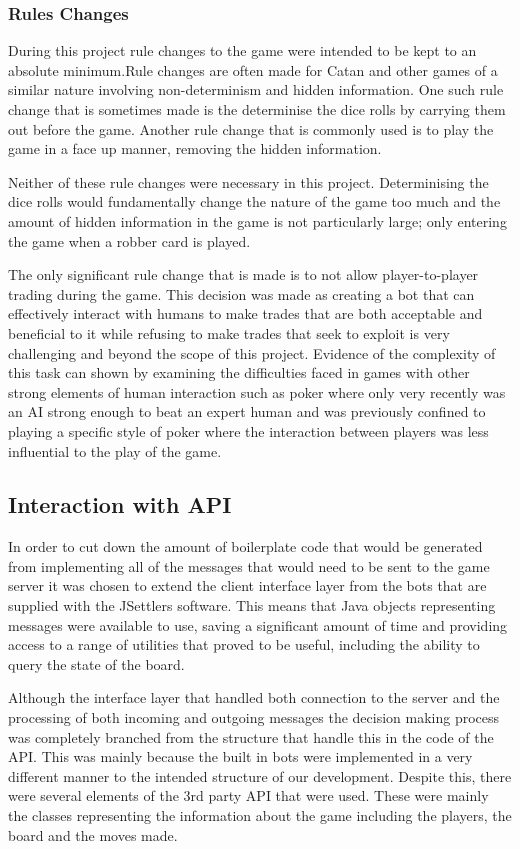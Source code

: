 \documentclass[]{article}
\begin{document}
\subsubsection{Rules Changes}
During this project rule changes to the game were intended to be kept to an absolute minimum.Rule changes are often made for Catan and other games of a similar nature involving non-determinism and hidden information. One such rule change that is sometimes made is the determinise the dice rolls by carrying them out before the game. Another rule change that is commonly used is to play the game in a face up manner, removing the hidden information.

Neither of these rule changes were necessary in this project. Determinising the dice rolls would fundamentally change the nature of the game too much and the amount of hidden information in the game is not particularly large; only entering the game when a robber card is played.

The only significant rule change that is made is to not allow player-to-player trading during the game. This decision was made as creating a bot that can effectively interact with humans to make trades that are both acceptable and beneficial to it while refusing to make trades that seek to exploit is very challenging and beyond the scope of this project. Evidence of the complexity of this task can shown by examining the difficulties faced in games with other strong elements of human interaction such as poker where only very recently was an AI strong enough to beat an expert human and was previously confined to playing a specific style of poker where the interaction between players was less influential to the play of the game.

\subsection{Interaction with API}
In order to cut down the amount of boilerplate code that would be generated from implementing all of the messages that would need to be sent to the game server it was chosen to extend the client interface layer from the bots that are supplied with the JSettlers software. This means that Java objects representing messages were available to use, saving a significant amount of time and providing access to a range of utilities that proved to be useful, including the ability to query the state of the board.

\par Although the interface layer that handled both connection to the server and the processing of both incoming and outgoing messages the decision making process was completely branched from the structure that handle this in the code of the API. This was mainly because the built in bots were implemented in a very different manner to the intended structure of our development. Despite this, there were several elements of the 3rd party API that were used. These were mainly the classes representing the information about the game including the players, the board and the moves made.
\end{document}
